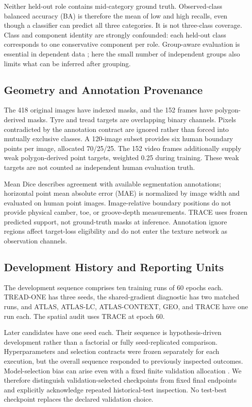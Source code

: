 Neither held-out role contains mid-category ground truth. Observed-class balanced accuracy (BA) is therefore the mean of low and high recalls, even though a classifier can predict all three categories. It is not three-class coverage. Class and component identity are strongly confounded: each held-out class corresponds to one conservative component per role. Group-aware evaluation is essential in dependent data \cite{groups}; here the small number of independent groups also limits what can be inferred after grouping.

\subsection{Geometry and Annotation Provenance}
The 418 original images have indexed masks, and the 152 frames have polygon-derived masks. Tyre and tread targets are overlapping binary channels. Pixels contradicted by the annotation contract are ignored rather than forced into mutually exclusive classes. A 120-image subset provides six human boundary points per image, allocated 70/25/25. The 152 video frames additionally supply weak polygon-derived point targets, weighted 0.25 during training. These weak targets are not counted as independent human evaluation truth.

Mean Dice describes agreement with available segmentation annotations; horizontal point mean absolute error (MAE) is normalized by image width and evaluated on human point images. Image-relative boundary positions do not provide physical camber, toe, or groove-depth measurements. TRACE uses frozen predicted support, not ground-truth masks at inference. Annotation ignore regions affect target-loss eligibility and do not enter the texture network as observation channels.

\subsection{Development History and Reporting Units}
The development sequence comprises ten training runs of 60 epochs each. TREAD-ONE has three seeds, the shared-gradient diagnostic has two matched runs, and ATLAS, ATLAS-LC, ATLAS-CONTEXT, GEO, and TRACE have one run each. The spatial audit uses TRACE at epoch 60.

Later candidates have one seed each. Their sequence is hypothesis-driven development rather than a factorial or fully seed-replicated comparison. Hyperparameters and selection contracts were frozen separately for each execution, but the overall sequence responded to previously inspected outcomes. Model-selection bias can arise even with a fixed finite validation allocation \cite{selectionbias}. We therefore distinguish validation-selected checkpoints from fixed final endpoints and explicitly acknowledge repeated historical-test inspection. No test-best checkpoint replaces the declared validation choice.

